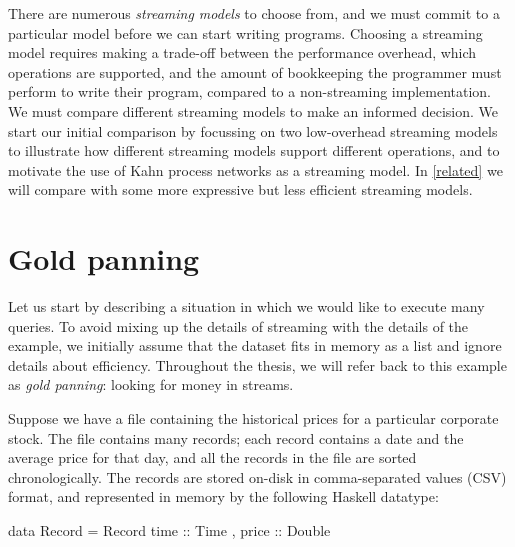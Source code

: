 There are numerous \emph{streaming models} to choose from, and we must commit to a particular model before we can start writing programs.
Choosing a streaming model requires making a trade-off between the performance overhead, which operations are supported, and the amount of bookkeeping the programmer must perform to write their program, compared to a non-streaming implementation.
We must compare different streaming models to make an informed decision.
We start our initial comparison by focussing on two low-overhead streaming models to illustrate how different streaming models support different operations, and to motivate the use of Kahn process networks as a streaming model.
In \cref{related} we will compare with some more expressive but less efficient streaming models.

\section{Gold panning}
\label{taxonomy/gold-panning}
Let us start by describing a situation in which we would like to execute many queries.
To avoid mixing up the details of streaming with the details of the example, we initially assume that the dataset fits in memory as a list and ignore details about efficiency.
Throughout the thesis, we will refer back to this example as \emph{gold panning}: looking for money in streams.

Suppose we have a file containing the historical prices for a particular corporate stock.
The file contains many records; each record contains a date and the average price for that day, and all the records in the file are sorted chronologically.
The records are stored on-disk in comma-separated values (CSV) format, and represented in memory by the following Haskell datatype:

\begin{haskell}
data Record = Record
 { time  :: Time
 , price :: Double }
\end{haskell}


